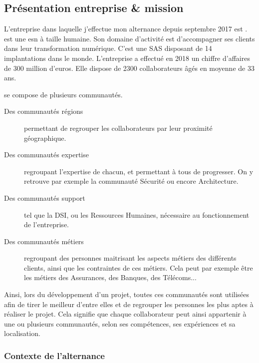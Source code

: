 \subsection*{Présentation entreprise \& mission}

L'entreprise dans laquelle j'effectue mon alternance depuis septembre 2017 est \onepoint. \xmakefirstuc{\onepoint{}} est une \gls{esn} à taille humaine. Son domaine d'activité est d'accompagner ses clients dans leur transformation numérique. C'est une \gls{SAS} disposant de 14 implantations dans le monde. L'entreprise a effectué en 2018 un chiffre d'affaires de 300 million d'euros. Elle dispose de 2300 collaborateurs âgés en moyenne de 33 ans.

\xmakefirstuc{\onepoint{}} se compose de plusieurs communautés.

\begin{description}
	\item [Des communautés régions] permettant de regrouper les collaborateurs par leur proximité géographique.
	\item [Des communautés expertise] regroupant l'expertise de chacun, et permettant à tous de progresser. On y retrouve par exemple la communauté Sécurité ou encore Architecture.
	\item [Des communautés support] tel que la \gls{DSI}, ou les Ressources Humaines, nécessaire au fonctionnement de l'entreprise.
	\item [Des communautés métiers] regroupant des personnes maitrisant les aspects métiers des différents clients, ainsi que les contraintes de ces métiers. Cela peut par exemple être les métiers des Assurances, des Banques, des Télécoms... 
\end{description}

Ainsi, lors du développement d'un projet, toutes ces communautés sont utilisées afin de tirer le meilleur d'entre elles et de regrouper les personnes les plus aptes à réaliser le projet. Cela signifie que chaque collaborateur peut ainsi appartenir à une ou plusieurs communautés, selon ses compétences, ses expériences et sa localisation. 

\subsubsection*{Contexte de l'alternance}

